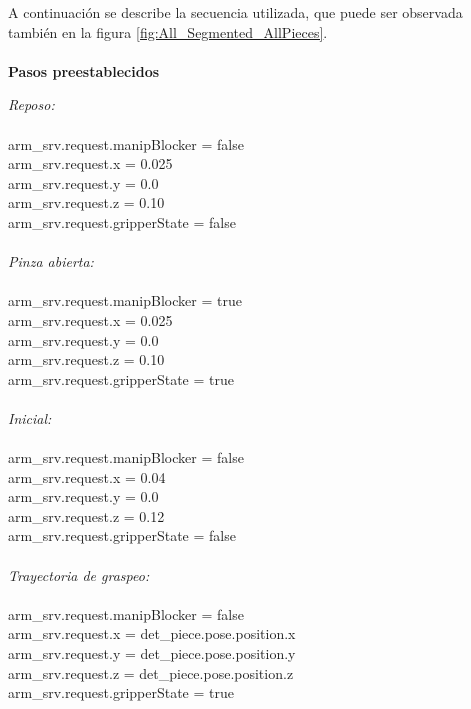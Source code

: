 A continuación se describe la secuencia utilizada, que puede ser observada también en la figura \ref{fig:All_Segmented_AllPieces}.
\phantom{holis}\\
\phantom{holis}\\
\textbf{Pasos preestablecidos}
    \begin{center}
    \emph{Reposo:}
        \phantom{holis}\\
        \phantom{holis}\\
        arm\_srv.request.manipBlocker = false\\
        arm\_srv.request.x = 0.025\\
        arm\_srv.request.y = 0.0\\
        arm\_srv.request.z = 0.10\\
        arm\_srv.request.gripperState = false\\
        \phantom{saltodelineaforzado >:D}\\
        
    \emph{Pinza abierta:}
        \phantom{holis}\\
        \phantom{holis}\\
        arm\_srv.request.manipBlocker = true\\
        arm\_srv.request.x = 0.025\\
        arm\_srv.request.y = 0.0\\
        arm\_srv.request.z = 0.10\\
        arm\_srv.request.gripperState = true\\
        \phantom{saltodelineaforzado >:D}\\
    \newpage
    \emph{Inicial:}
        \phantom{holis}\\
        \phantom{holis}\\
        arm\_srv.request.manipBlocker = false\\
        arm\_srv.request.x = 0.04\\
        arm\_srv.request.y = 0.0\\
        arm\_srv.request.z = 0.12\\
        arm\_srv.request.gripperState = false\\
        \phantom{saltodelineaforzado >:D}\\

    \emph{Trayectoria de graspeo:}
        \phantom{holis}\\
        \phantom{holis}\\
        arm\_srv.request.manipBlocker = false\\
        arm\_srv.request.x = det\_piece.pose.position.x\\
        arm\_srv.request.y = det\_piece.pose.position.y\\
        arm\_srv.request.z = det\_piece.pose.position.z\\
        arm\_srv.request.gripperState = true\\
        \phantom{saltodelineaforzado >:D}\\
   

\end{center}
